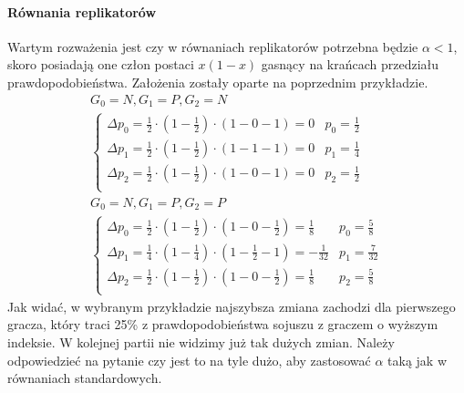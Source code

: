 \paragraph{Równania replikatorów}
Wartym rozważenia jest czy w równaniach replikatorów potrzebna będzie $\alpha < 1$, skoro posiadają one człon postaci $x(1-x)$ gasnący na krańcach przedziału prawdopodobieństwa. Założenia zostały oparte na poprzednim przykładzie.
\begin{gather*}
G_0 = N, G_1 = P, G_2 = N \\
\left\{
\begin{array}{ll}
\Delta p_0 = \frac{1}{2} \cdot (1 - \frac{1}{2}) \cdot (1 - 0 - 1) =  0 & p_0=\frac{1}{2}\\
\Delta p_1 = \frac{1}{2} \cdot (1 - \frac{1}{2}) \cdot (1 - 1 - 1) =  0 & p_1= \frac{1}{4}\\
\Delta p_2 = \frac{1}{2} \cdot (1 - \frac{1}{2}) \cdot (1 - 0 - 1) =  0 & p_2=\frac{1}{2}\\
\end{array} 
\right.
\\
G_0 = N, G_1 = P, G_2 = P \\
\left\{
\begin{array}{ll}
\Delta p_0 = \frac{1}{2} \cdot (1 - \frac{1}{2}) \cdot (1 - 0 - \frac{1}{2}) = \frac{1}{8} & p_0=\frac{5}{8}\\
\Delta p_1 = \frac{1}{4} \cdot (1 - \frac{1}{4}) \cdot (1 - \frac{1}{2} - 1) = -\frac{1}{32} & p_1= \frac{7}{32}\\
\Delta p_2 = \frac{1}{2} \cdot (1 - \frac{1}{2}) \cdot (1 - 0 - \frac{1}{2}) = \frac{1}{8}  & p_2=\frac{5}{8}\\
\end{array}
\right.
\end{gather*}
Jak widać, w wybranym przykładzie najszybsza zmiana zachodzi dla pierwszego gracza, który traci 25\% z prawdopodobieństwa sojuszu z graczem o wyższym indeksie. W kolejnej partii nie widzimy już tak dużych zmian. Należy odpowiedzieć na pytanie czy jest to na tyle dużo, aby zastosować $\alpha$ taką jak w równaniach standardowych.

